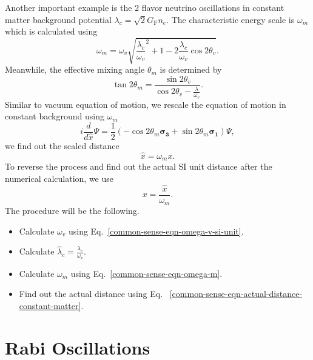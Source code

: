 Another important example is the 2 flavor neutrino oscillations in constant matter background potential $\lambda_c = \sqrt{2}G_{\mathrm F} n_e$. The characteristic energy scale is $\omega_m$ which is calculated using
\begin{equation}
   \omega_m = \omega_v \sqrt{ \frac{\lambda_c}{\omega_v}^2 + 1 - 2 \frac{\lambda_c}{\omega_v}\cos 2\theta_v }.
   \label{common-sense-eqn-omega-m}
\end{equation}
Meanwhile, the effective mixing angle $\theta_m$ is determined by
\begin{equation}
   \tan 2\theta_m = \frac{\sin 2\theta_v}{\cos 2\theta_v - \frac{\lambda}{\omega_v} }.
\end{equation}
Similar to vacuum equation of motion, we rescale the equation of motion in constant background using $\omega_m$
\begin{equation}
   i \frac{d}{d\hat x} \Psi = \frac{1}{2}(-\cos 2\theta_m \boldsymbol{\sigma_3} + \sin 2\theta_m \boldsymbol{\sigma_1})\Psi ,
\end{equation}
we find out the scaled distance
\begin{equation}
   \hat x = \omega_m x.
\end{equation}
To reverse the process and find out the actual SI unit distance after the numerical calculation, we use
\begin{equation}
   x = \frac{\hat x}{\omega_m}.
   \label{common-sense-eqn-actual-distance-constant-matter}
\end{equation}
The procedure will be the following.
\begin{itemize}
    \item Calculate $\omega_v$ using Eq.~\ref{common-sense-eqn-omega-v-si-unit}.
\item Calculate $\hat\lambda_c = \frac{\lambda_c}{\omega_v}$.
\item Calculate $\omega_m$ using Eq.~\ref{common-sense-eqn-omega-m}.
\item Find out the actual distance using Eq.~ \ref{common-sense-eqn-actual-distance-constant-matter}.
\end{itemize}


\chapter{\label{app:rabi-oscillations}Rabi Oscillations}

